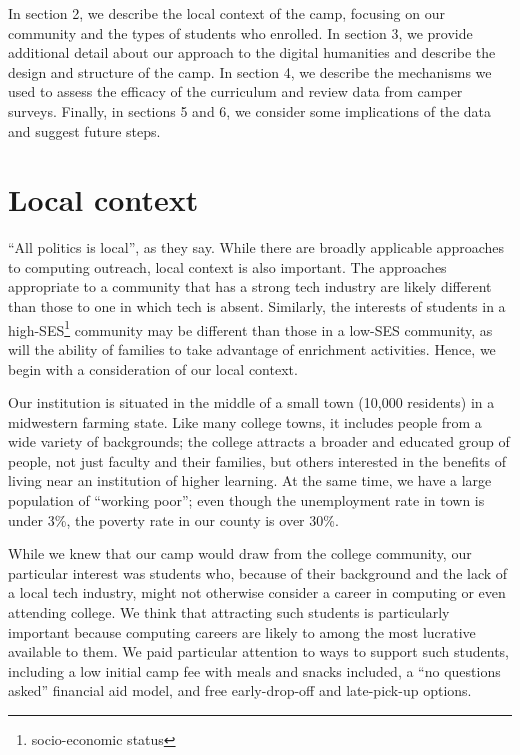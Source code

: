 In section 2, we describe the local context of the camp, focusing
on our community and the types of students who enrolled.  In section
3, we provide additional detail about our approach to the digital
humanities and describe the design and structure of the camp.  In
section 4, we describe the mechanisms we used to assess the efficacy
of the curriculum and review data from camper surveys.  Finally,
in sections 5 and 6, we consider some implications of the data and
suggest future steps.

\section{Local context}

``All politics is local'', as they say.  While there are broadly
applicable approaches to computing outreach, local context is also
important.  The approaches appropriate to a community that has a
strong tech industry are likely different than those to one in which
tech is absent.  Similarly, the interests of students in a
high-SES\footnote{socio-economic status} community may be different
than those in a low-SES community, as will the ability of families
to take advantage of enrichment activities.  Hence, we begin with
a consideration of our local context.

Our institution is situated in the middle of a small town (10,000
residents) in a midwestern farming state.  Like many college towns,
it includes people from a wide variety of backgrounds; the college
attracts a broader and educated group of people, not just faculty
and their families, but others interested in the benefits of living
near an institution of higher learning.  At the same time, 
we have a large population of ``working poor''; even
though the unemployment rate in town is under 3\%, the poverty rate
in our county is over 30\%.

While we knew that our camp would draw from the college community,
our particular interest was students who, because of their background
and the lack of a local tech industry, might not otherwise consider
a career in computing or even attending college.  We think that
attracting such students is particularly important because computing
careers are likely to among the most lucrative available to them.
We paid particular attention to ways to support such students,
including a low initial camp fee with meals and snacks included, a
``no questions asked'' financial aid model, and free early-drop-off
and late-pick-up options.

